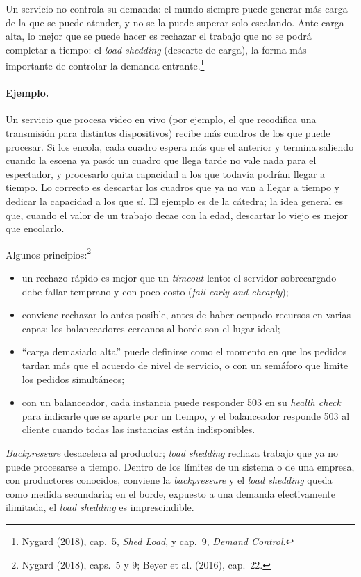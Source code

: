 \documentclass[variant=apuntes,cover=institutional,mode=screen]{ua-engineering-v6-article}
\begin{document}
Un servicio no controla su demanda: el mundo siempre puede generar más carga de la que se puede atender, y no se la puede superar solo escalando. Ante carga alta, lo mejor que se puede hacer es rechazar el trabajo que no se podrá completar a tiempo: el \emph{load shedding} (descarte de carga), la forma más importante de controlar la demanda entrante.\footnote{Nygard (2018), cap.~5, \emph{Shed Load}, y cap.~9, \emph{Demand Control}.}

\paragraph{Ejemplo.} Un servicio que procesa video en vivo (por ejemplo, el que recodifica una transmisión para distintos dispositivos) recibe más cuadros de los que puede procesar. Si los encola, cada cuadro espera más que el anterior y termina saliendo cuando la escena ya pasó: un cuadro que llega tarde no vale nada para el espectador, y procesarlo quita capacidad a los que todavía podrían llegar a tiempo. Lo correcto es descartar los cuadros que ya no van a llegar a tiempo y dedicar la capacidad a los que sí. El ejemplo es de la cátedra; la idea general es que, cuando el valor de un trabajo decae con la edad, descartar lo viejo es mejor que encolarlo.

Algunos principios:\footnote{Nygard (2018), caps.~5 y 9; Beyer et al. (2016), cap.~22.}
\begin{itemize}
\item un rechazo rápido es mejor que un \emph{timeout} lento: el servidor sobrecargado debe fallar temprano y con poco costo (\emph{fail early and cheaply});
\item conviene rechazar lo antes posible, antes de haber ocupado recursos en varias capas; los balanceadores cercanos al borde son el lugar ideal;
\item ``carga demasiado alta'' puede definirse como el momento en que los pedidos tardan más que el acuerdo de nivel de servicio, o con un semáforo que limite los pedidos simultáneos;
\item con un balanceador, cada instancia puede responder 503 en su \emph{health check} para indicarle que se aparte por un tiempo, y el balanceador responde 503 al cliente cuando todas las instancias están indisponibles.
\end{itemize}

\emph{Backpressure} desacelera al productor; \emph{load shedding} rechaza trabajo que ya no puede procesarse a tiempo. Dentro de los límites de un sistema o de una empresa, con productores conocidos, conviene la \emph{backpressure} y el \emph{load shedding} queda como medida secundaria; en el borde, expuesto a una demanda efectivamente ilimitada, el \emph{load shedding} es imprescindible.
\end{document}
